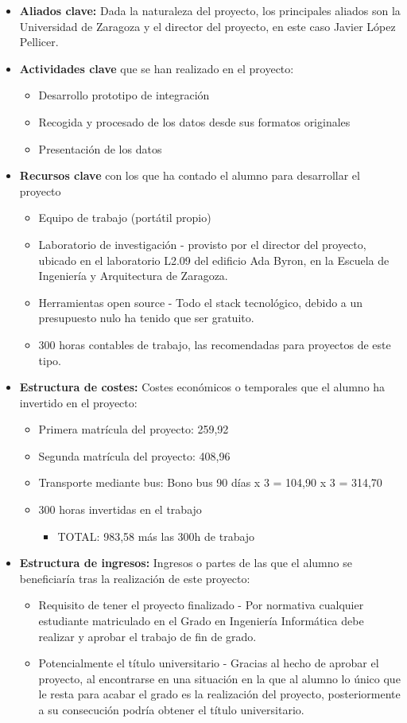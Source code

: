 \begin{itemize}
\item \textbf{Aliados clave:} Dada la naturaleza del proyecto, los principales aliados son la Universidad de Zaragoza y el director del proyecto, en este caso Javier López Pellicer.
\item \textbf{Actividades clave} que se han realizado en el proyecto:
\begin{itemize}
\item Desarrollo prototipo de integración
\item Recogida y procesado de los datos desde sus formatos originales
\item Presentación de los datos
\end{itemize}
\item \textbf{Recursos clave} con los que ha contado el alumno para desarrollar el proyecto 
\begin{itemize}
\item Equipo de trabajo (portátil propio)
\item Laboratorio de investigación - provisto por el director del proyecto, ubicado en el laboratorio L2.09 del edificio Ada Byron, en la Escuela de Ingeniería y Arquitectura de Zaragoza.
\item Herramientas open source - Todo el stack tecnológico, debido a un presupuesto nulo ha tenido que ser gratuito.
\item 300 horas contables de trabajo, las recomendadas para proyectos de este tipo.
\end{itemize}
\item \textbf{Estructura de costes:} Costes económicos o temporales que el alumno ha invertido en el proyecto:
\begin{itemize}
\item Primera matrícula del proyecto: 259,92
\item Segunda matrícula del proyecto: 408,96
\item Transporte mediante bus: Bono bus 90 días x 3 = 104,90 x 3 = 314,70
\item 300 horas invertidas en el trabajo
\begin{itemize}
\item TOTAL: 983,58 más las 300h de trabajo
\end{itemize}
\end{itemize}
\item \textbf{Estructura de ingresos:} Ingresos o partes de las que el alumno se beneficiaría tras la realización de este proyecto:
\begin{itemize}
\item Requisito de tener el proyecto finalizado - Por normativa cualquier estudiante matriculado en el Grado en Ingeniería Informática debe realizar y aprobar el trabajo de fin de grado.
\item Potencialmente el título universitario - Gracias al hecho de aprobar el proyecto, al encontrarse en una situación en la que al alumno lo único que le resta para acabar el grado es la realización del proyecto, posteriormente a su consecución podría obtener el título universitario. 
\end{itemize}
\end{itemize}

